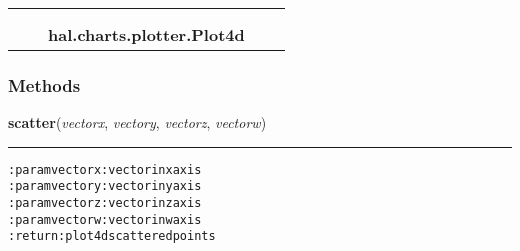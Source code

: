     \label{hal:charts:plotter:Plot4d}
\begin{tabular}{cccccc}
\multicolumn{2}{r}{\settowidth{\BCL}{object}\multirow{2}{\BCL}{object}}
&&
  \\\cline{3-3}
  &&\multicolumn{1}{c|}{}
&&
  \\
&&\multicolumn{2}{l}{\textbf{hal.charts.plotter.Plot4d}}
\end{tabular}



  \subsubsection{Methods}

    \label{hal:charts:plotter:Plot4d:scatter}

    \vspace{0.5ex}

\hspace{.8\funcindent}\begin{boxedminipage}{\funcwidth}

    \raggedright \textbf{scatter}(\textit{vectorx}, \textit{vectory}, \textit{vectorz}, \textit{vectorw})

    \vspace{-1.5ex}

    \rule{\textwidth}{0.5\fboxrule}
\setlength{\parskip}{2ex}
\begin{alltt}

:param vectorx: vector in x axis
:param vectory: vector in y axis
:param vectorz: vector in z axis
:param vectorw: vector in w axis
:return: plot 4d scattered points
\end{alltt}

\setlength{\parskip}{1ex}
    \end{boxedminipage}

    \label{hal:charts:plotter:Plot4d:param}

